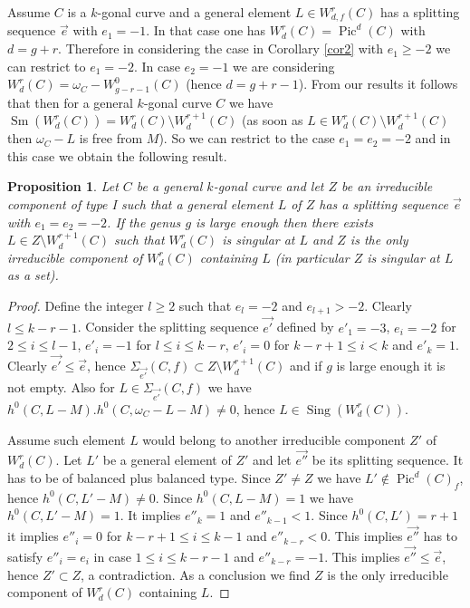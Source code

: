 \documentclass{article}
\DeclareMathOperator{\Pic}{Pic}
\DeclareMathOperator{\Sm}{Sm}
\DeclareMathOperator{\Sing}{Sing}
\newtheorem{proposition}{Proposition}
\theoremstyle{definition}
\theoremstyle{remark}
\begin{document}
Assume $C$ is a $k$-gonal curve and a general element $L\in W^r_{d,f}(C)$ has a splitting sequence $\overrightarrow {e}$ with $e_1=-1$.
In that case one has $W^r_d(C)=\Pic^d(C)$ with $d=g+r$.
Therefore in considering the case in Corollary \ref{cor2} with $e_1 \geq -2$ we can restrict to $e_1=-2$.
In case $e_2=-1$ we are considering $W^r_d(C)=\omega _C-W^0_{g-r-1}(C)$ (hence $d=g+r-1$).
From our results it follows that then for a general $k$-gonal curve $C$ we have $\Sm (W^r_d(C))=W^r_d(C) \setminus W^{r+1}_d(C)$ (as soon as $L \in W^r_d(C) \setminus W^{r+1}_d(C)$ then $\omega _C -L$ is free from $M$).
So we can restrict to the case $e_1=e_2=-2$ and in this case we obtain the following result.

\begin{proposition}\label{prop5}
Let $C$ be a general $k$-gonal curve and let $Z$ be an irreducible component of type I such that a general element $L$ of $Z$ has a splitting sequence $\overrightarrow{e}$ with $e_1=e_2=-2$.
If the genus $g$ is large enough then there exists $L \in Z \setminus W^{r+1}_d(C)$ such that $W^r_d(C)$ is singular at $L$ and $Z$ is the only irreducible component of $W^r_d(C)$ containing $L$ (in particular $Z$ is singular at $L$ as a set).
\end{proposition}
\begin{proof}
Define the integer $l \geq 2$ such that $e_l=-2$ and $e_{l+1}>-2$.
Clearly $l \leq k-r-1$.
Consider the splitting sequence $\overrightarrow{e'}$ defined by $e'_1=-3$, $e_i=-2$ for $2 \leq i \leq l-1$, $e'_i=-1$ for $l\leq i \leq k-r$, $e'_i=0$ for $k-r+1 \leq i <k$ and $e'_k=1$.
Clearly $\overrightarrow {e'} \leq \overrightarrow {e}$, hence $\Sigma_{\overrightarrow {e'}}(C,f)\subset Z\setminus W^{r+1}_d(C)$ and if $g$ is large enough it is not empty.
Also for $L \in \Sigma _{\overrightarrow {e'}}(C,f)$ we have $h^0(C,L-M).h^0(C,\omega _C-L-M)\neq 0$, hence $L \in \Sing(W^r_d(C))$.

Assume such element $L$ would belong to another irreducible component $Z'$ of $W^r_d(C)$.
Let $L'$ be a general element of $Z'$ and let $\overrightarrow {e''}$ be its splitting sequence.
It has to be of balanced plus balanced type.
Since $Z' \neq Z$ we have $L' \notin \Pic^d(C)_f$, hence $h^0(C,L'-M)\neq 0$.
Since $h^0(C,L-M)=1$ we have $h^0(C,L'-M)=1$.
It implies $e''_k=1$ and $e''_{k-1}<1$.
Since $h^0(C,L')=r+1$ it implies $e''_i=0$ for $k-r+1 \leq i \leq k-1$ and $e''_{k-r}<0$.
This implies $\overrightarrow {e''}$ has to satisfy $e''_i=e_i$ in case $1 \leq i \leq k-r-1$ and $e''_{k-r}=-1$.
This implies $\overrightarrow {e''} \leq \overrightarrow {e}$, hence $Z' \subset Z$, a contradiction.
As a conclusion we find $Z$ is the only irreducible component of $W^r_d(C)$ containing $L$.
\end{proof}
\end{document}
